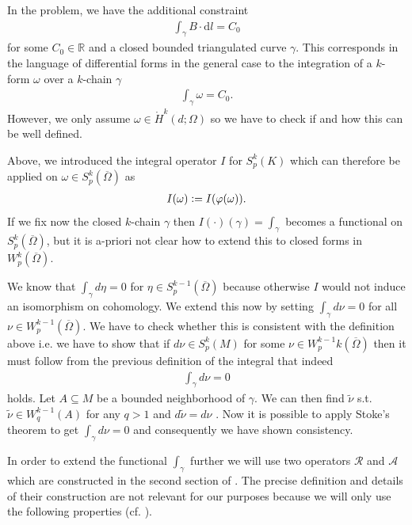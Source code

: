 \documentclass[12pt,a4paper]{article}
\theoremstyle{definition}
\newcommand{\omegabar}{\overline{\Omega}}
\newcommand{\real}{\mathbb{R}}
\begin{document}
In the problem, we have the additional constraint 
\begin{align*}
    \int_\gamma B \cdot \text{d}l = C_0
\end{align*}
for some $C_0 \in \real$ and a closed bounded triangulated curve $\gamma$.
This corresponds in the language of differential forms in the general case
to the integration of a $k$-form $\omega$
over a $k$-chain $\gamma$
\begin{align*}
    \int_\gamma \omega  = C_0.
\end{align*}
However, we only assume 
$\omega \in \mathring{H}^k(d;\Omega)$ so we have to check if and how this can
be well defined.

Above, we introduced the integral operator $I$ for $S^k_p(K)$ which can 
therefore be applied on $\omega \in S^k_p(\omegabar)$ as
\begin{align*}
    I(\omega) \vcentcolon= I (\varphi(\omega)).
\end{align*}
\noindent If we fix now the closed 
$k$-chain $\gamma$ then $I(\cdot)(\gamma) = \int_\gamma$ becomes a functional on
$S^k_p(\omegabar)$, but it is a-priori not clear how to extend this to closed forms in
$W_p^k(\omegabar)$. 

We know that $\int_\gamma d\eta = 0$ for $\eta \in S^{k-1}_p(\omegabar)$ because 
otherwise $I$ would not induce an isomorphism on cohomology. We extend this now
by setting $\int_\gamma d\nu = 0$ for all $\nu \in W^{k-1}_p(\omegabar)$. 
We have to check whether this is consistent with the definition above i.e. we
have to show that if $d\nu \in S^k_p(M)$ for some 
$\nu \in W_p^{k-1}k(\omegabar)$ then 
it must follow from the previous definition of the integral that indeed
\begin{align*}
    \int_\gamma d\nu = 0
\end{align*}
holds.
Let $A \subseteq M$ be a bounded neighborhood of $\gamma$. We can then find 
$\tilde{\nu}$ s.t.  $\tilde{\nu} \in W^{k-1}_q(A)$ for any $q > 1$ and 
$d\tilde{\nu} = d\nu$ \cite[Thm 3.1.1]{schwarz}. Now it is possible to apply 
Stoke's theorem \cite[Thm. 9]{goldshtein_integration} to get  
$\int_\gamma d\nu = 0$ and consequently we have shown consistency.


In order to extend the functional $\int_\gamma$ 
further we will use two operators
$\mathscr{R}$ and $\mathscr{A}$ which are constructed in the second section 
of \cite{goldshtein}. The precise definition and details of their construction
are not relevant for our purposes because we will only use
the following properties (cf. \cite[Thm.2]{goldshtein}).
\end{document}
